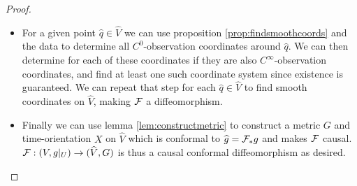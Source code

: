 \begin{proof}
\begin{itemize}
    
    
    
    \item For a given point $\widehat{q}\in \widehat{V}$ we can use proposition \ref{prop:findsmoothcoords} and the data to determine all $C^0$-observation coordinates around $\widehat{q}$. We can then determine for each of these coordinates if they are also $C^\infty$-observation coordinates, and find at least one such coordinate system since existence is guaranteed. We can repeat that step for each $\widehat{q}\in \widehat{V}$ to find smooth coordinates on $\widehat{V}$, making $\mathcal{F}$ a diffeomorphism. 
    
    \item Finally we can use lemma \ref{lem:constructmetric} to construct a metric $G$ and time-orientation $X$ on $\widehat{V}$ which is conformal to $\widehat{g}=\mathcal{F}_*g$ and makes $\mathcal{F}$ causal. 
    $\mathcal{F}:(V,g\rvert_U)\to (\widehat{V},G)$ is thus a causal conformal diffeomorphism as desired.
    \end{itemize}
\end{proof}

